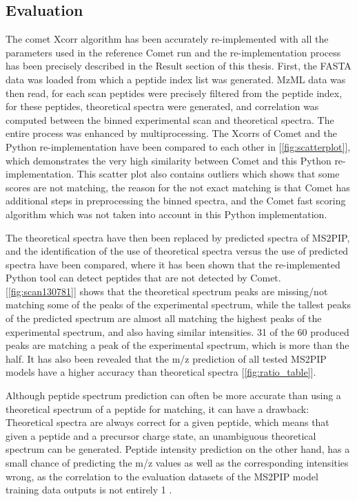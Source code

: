 \documentclass[11pt]{article}
\begin{document}
\subsection{Evaluation}
The comet Xcorr algorithm has been accurately re-implemented with all the parameters used in the reference Comet run and the re-implementation process has been precisely described in the Result section of this thesis. First, the FASTA data was loaded from which a peptide index list was generated. MzML data was then read, for each scan peptides were precisely filtered from the peptide index, for these peptides, theoretical spectra were generated, and correlation was computed between the binned experimental scan and theoretical spectra. The entire process was enhanced by multiprocessing. The Xcorrs of Comet and the Python re-implementation have been compared to each other in [\cref{fig:scatterplot}], which demonstrates the very high similarity between Comet and this Python re-implementation. This scatter plot also contains outliers which shows that some scores are not matching, the reason for the not exact matching is that Comet has additional steps in preprocessing the binned spectra, and the Comet fast scoring algorithm which was not taken into account in this Python implementation. 

The theoretical spectra have then been replaced by predicted spectra of MS2PIP, and the identification of the use of theoretical spectra versus the use of predicted spectra have been compared, where it has been shown that the re-implemented Python tool can detect peptides that are not detected by Comet. [\cref{fig:scan130781}] shows that the theoretical spectrum peaks are missing/not matching some of the peaks of the experimental spectrum, while the tallest peaks of the predicted spectrum are almost all matching the highest peaks of the experimental spectrum, and also having similar intensities. 31 of the 60 produced peaks are matching a peak of the experimental spectrum, which is more than the half. It has also been revealed that the m/z prediction of all tested MS2PIP models have a higher accuracy than theoretical spectra [\cref{fig:ratio_table}]. 

Although peptide spectrum prediction can often be more accurate than using a theoretical spectrum of a peptide for matching,
it can have a drawback: Theoretical spectra are always correct for a given peptide, which means that given a peptide and a precursor charge state, an unambiguous theoretical spectrum can be generated. Peptide intensity prediction on the other hand, has a small chance of predicting the m/z values as well as the corresponding intensities wrong, as the correlation to the evaluation datasets of the MS2PIP model training data outputs is not entirely 1 \cite{ms2pip-3-13-0}.
\end{document}
